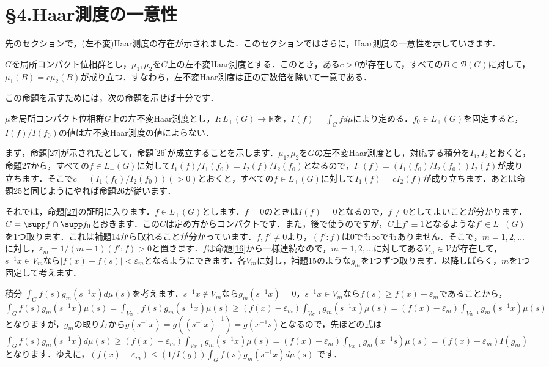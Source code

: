 \section{\S 4.Haar測度の一意性}
先のセクションで，(左不変)Haar測度の存在が示されました．このセクションではさらに，Haar測度の一意性を示していきます．

\begin{prop}\label{26}
$G$を局所コンパクト位相群とし，$\mu_1, \mu_2$を$G$上の左不変Haar測度とする．このとき，ある$c>0$が存在して，すべての$B \in \mathscr{B}(G)$に対して，$\mu_1(B)=c\mu_2(B)$が成り立つ．すなわち，左不変Haar測度は正の定数倍を除いて一意である．
\end{prop}
この命題を示すためには，次の命題を示せば十分です．
\begin{prop}\label{27}
$\mu$を局所コンパクト位相群$G$上の左不変Haar測度とし，$I \colon L_{+}(G) \to \mathbb{R}$を，$I(f)=\int_{G}f d\mu$により定める．$f_0 \in L_{+}(G)$を固定すると，$I(f)/I(f_0)$の値は左不変Haar測度の値によらない．
\end{prop}
まず，命題\ref{27}が示されたとして，命題\ref{26}が成立することを示します．$\mu_1, \mu_2$を$G$の左不変Haar測度とし，対応する積分を$I_1, I_2$とおくと，命題27から，すべての$f \in L_{+}(G)$に対して$I_{1}(f)/I_{1}(f_0)=I_{2}(f)/I_{2}(f_0)$となるので，$I_{1}(f)= \left( I_{1}(f_0)/I_{2}(f_{0}) \right) I_{2}(f)$が成り立ちます．そこで$c=\left( I_{1}(f_0)/I_{2}(f_{0}) \right)(>0)$とおくと，すべての$f \in L_{+}(G)$に対して$I_{1}(f)= c I_{2}(f)$が成り立ちます．あとは命題25と同じようにやれば命題26が従います．　\proofend

それでは，命題\ref{27}の証明に入ります．$f \in L_{+}(G)$とします．$f=0$のときは$I(f)=0$となるので，$f \neq 0$としてよいことが分かります．$C=\supp f \cap \supp f_{0}$とおきます．この$C$は定め方からコンパクトです．また，後で使うのですが，$C$上$f' \equiv 1$となるような$f' \in L_{
+}(G)$を1つ取ります．これは補題14から取れることが分かっています．$f, f' \neq 0$より，$\left( f' \colon f\right)$は0でも$\infty$でもありません．そこで，$m=1,2,\ldots$に対し，$\varepsilon_{m}=1/(m+1)\left( f' \colon f \right)>0$と置きます．$f$は命題\ref{16}から一様連続なので，$m=1,2,\ldots$に対してある$V_m \in \mathscr{V}$が存在して，$s^{-1}x \in V_m$なら$|f(x)-f(s)|<\varepsilon _{m}$となるようにできます．各$V_m$に対し，補題15のような$g_m$を1つずつ取ります．以降しばらく，$m$を1つ固定して考えます．

積分 $\int_{G}f(s)g_{m}(s^{-1}x)d\mu(s)$を考えます．$s^{-1}x \not\in V_m$なら$g_{m}(s^{-1}x)=0$，$s^{-1}x \in V_m$なら$f(s) \ge f(x) -\varepsilon_{m}$であることから，$\int_{G}f(s)g_{m}(s^{-1}x)\mu(s)=\int_{Vx^{-1}}f(s)g_{m}(s^{-1}x)\mu(s) \ge (f(x)-\varepsilon_{m})\int_{Vx^{-1}}g_{m}(s^{-1}x)\mu(s)=(f(x)-\varepsilon_{m})\int_{Vx^{-1}}g_{m}(s^{-1}x)\mu(s)$となりますが，$g_{m}$の取り方から$g(s^{-1}x)=g\left( (s^{-1}x)^{-1} \right)=g(x^{-1}s)$となるので，先ほどの式は$\int_{G}f(s)g_{m}(s^{-1}x)d\mu(s) \ge (f(x)-\varepsilon_{m})\int_{Vx^{-1}}g_{m}(s^{-1}x)\mu(s) = (f(x)-\varepsilon_{m})\int_{Vx^{-1}}g_{m}(x^{-1}s)\mu(s)=(f(x)-\varepsilon_{m}) I(g_{m})$ となります．ゆえに，$(f(x)-\varepsilon_{m}) \le \left( 1/I(g) \right)\int_{G}f(s)g_{m}(s^{-1}x)d\mu(s)$ です．


